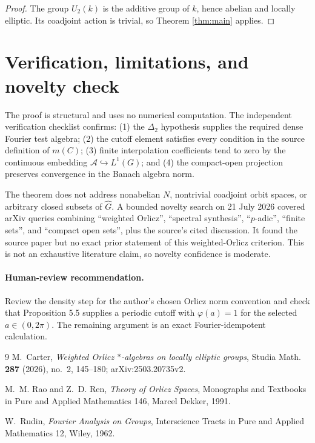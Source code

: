 \documentclass[11pt]{article}
\newcommand{\A}{\mathcal A}
\newcommand{\wideG}{\widehat G}
\begin{document}
\begin{proof}
The group $U_2(k)$ is the additive group of $k$, hence abelian and locally
elliptic.  Its coadjoint action is trivial, so Theorem \ref{thm:main} applies.
\end{proof}

\section{Verification, limitations, and novelty check}

The proof is structural and uses no numerical computation.  The independent
verification checklist confirms: (1) the $\Delta_2$ hypothesis supplies the
required dense Fourier test algebra; (2) the cutoff element satisfies every
condition in the source definition of $m(C)$; (3) finite interpolation
coefficients tend to zero by the continuous embedding $\A\hookrightarrow
L^1(G)$; and (4) the compact-open projection preserves convergence in the
Banach algebra norm.

The theorem does not address nonabelian $N$, nontrivial coadjoint orbit
spaces, or arbitrary closed subsets of $\wideG$.  A bounded novelty search on
21 July 2026 covered arXiv queries combining ``weighted Orlicz'', ``spectral
synthesis'', ``$p$-adic'', ``finite sets'', and ``compact open sets'', plus
the source's cited discussion.  It found the source paper but no exact prior
statement of this weighted-Orlicz criterion.  This is not an exhaustive
literature claim, so novelty confidence is moderate.

\paragraph{Human-review recommendation.}
Review the density step for the author's chosen Orlicz norm convention and
check that Proposition 5.5 supplies a periodic cutoff with
$\varphi(a)=1$ for the selected $a\in(0,2\pi)$.  The remaining argument is an
exact Fourier-idempotent calculation.

\begin{thebibliography}{9}
M.~Carter,
\emph{Weighted Orlicz $*$-algebras on locally elliptic groups},
Studia Math. \textbf{287} (2026), no.~2, 145--180;
arXiv:2503.20735v2.

M.~M. Rao and Z.~D. Ren,
\emph{Theory of Orlicz Spaces},
Monographs and Textbooks in Pure and Applied Mathematics 146,
Marcel Dekker, 1991.

W.~Rudin,
\emph{Fourier Analysis on Groups},
Interscience Tracts in Pure and Applied Mathematics 12,
Wiley, 1962.
\end{thebibliography}
\end{document}

